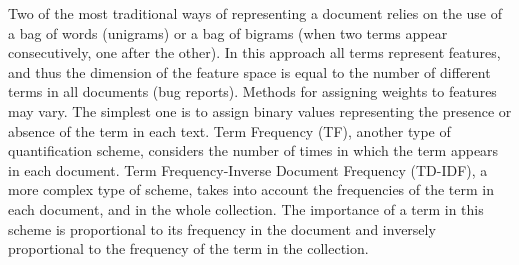 Two of the most traditional ways of representing a document relies on the use of a bag of words (unigrams) or a bag of bigrams (when two terms appear consecutively, one after the other)\cite{Feldman:2006}. In this approach all terms represent features, and thus the dimension of the feature space is equal to the number of different terms in all documents (bug reports). Methods for assigning weights to features may vary. The simplest one is to assign binary values representing the presence or absence of the term in each text. Term Frequency (TF), another type of quantification scheme, considers the number of times in which the term appears in each document. Term Frequency-Inverse Document Frequency (TD-IDF), a more complex type of scheme,  takes into account the frequencies of the term in each document, and in the whole collection.  The importance of a term in this scheme is proportional to its frequency in the document and inversely proportional to the frequency of the term in the collection. 